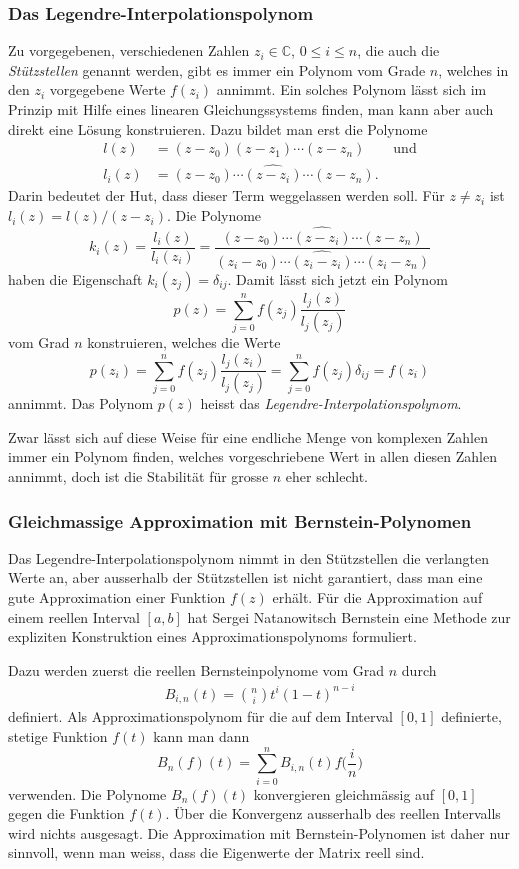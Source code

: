 \subsubsection{Das Legendre-Interpolationspolynom}
%
Zu vorgegebenen, verschiedenen Zahlen $z_i\in\mathbb{C}$, $0\le i\le n$,
die auch die {\em Stützstellen} genannt werden,
%
gibt es immer ein Polynom vom Grade $n$, welches in den $z_i$ vorgegebene
Werte $f(z_i)$ annimmt.
Ein solches Polynom lässt sich im Prinzip mit Hilfe eines linearen
Gleichungssystems finden, man kann aber auch direkt eine Lösung
konstruieren.
Dazu bildet man erst die Polynome
\begin{align*}
l(z) &= (z-z_0)(z-z_1)\cdots (z-z_n) \qquad\text{und}
\\
l_i(z) &= (z-z_0)\cdots \widehat{(z-z_i)}\cdots (z-z_n).
\end{align*}
Darin bedeutet der Hut, dass dieser Term weggelassen werden soll.
Für $z\ne z_i$ ist $l_i(z)=l(z)/(z-z_i)$.
Die Polynome
\[
k_i(z)
=
\frac{l_i(z)}{l_i(z_i)}
=
\frac{(z-z_0)\cdots \widehat{(z-z_i)}\cdots (z-z_n)}{(z_i-z_0)\cdots \widehat{(z_i-z_i)}\cdots (z_i-z_n)}
\]
haben die Eigenschaft
$k_i(z_j)=\delta_{i\!j}$.
Damit lässt sich jetzt ein Polynom
\[
p(z) = \sum_{j=0}^n f(z_j) \frac{l_j(z)}{l_j(z_j)}
\]
vom Grad $n$ konstruieren, welches die Werte
\[
p(z_i)
=
\sum_{j=0}^n f(z_j) \frac{l_j(z_i)}{l_j(z_j)}
=
\sum_{j=0}^n f(z_j) \delta_{i\!j}
=
f(z_i)
\]
annimmt.
Das Polynom $p(z)$ heisst das {\em Legendre-Interpolationspolynom}.

Zwar lässt sich auf diese Weise für eine endliche Menge von komplexen Zahlen
immer ein Polynom finden, welches vorgeschriebene Wert in allen diesen Zahlen
annimmt, doch ist die Stabilität für grosse $n$ eher schlecht.


\subsubsection{Gleichmassige Approximation mit Bernstein-Polynomen}
%
Das Legendre-Interpolationspolynom nimmt in den  Stützstellen die
verlangten Werte an, aber ausserhalb der Stützstellen ist nicht
garantiert, dass man eine gute Approximation einer Funktion $f(z)$
erhält.
Für die Approximation auf einem reellen Interval $[a,b]$ hat
Sergei Natanowitsch Bernstein eine Methode zur expliziten
Konstruktion eines Approximationspolynoms formuliert.

Dazu werden zuerst die reellen Bernsteinpolynome vom Grad $n$
durch
\begin{align*}
B_{i,n}(t) = \binom{n}{i} t^i(1-t)^{n-i}
\end{align*}
definiert.
Als Approximationspolynom für die auf dem Interval 
$[0,1]$ definierte, stetige Funktion $f(t)$ kann man dann
\[
B_n(f)(t)
=
\sum_{i=0}^n B_{i,n}(t) f\biggl(\frac{i}{n}\biggr)
\]
verwenden.
Die Polynome $B_n(f)(t)$ konvergieren gleichmässig auf $[0,1]$
gegen die Funktion $f(t)$.
Über die Konvergenz ausserhalb des reellen Intervalls wird nichts
ausgesagt.
Die Approximation mit Bernstein-Polynomen ist daher nur sinnvoll,
wenn man weiss, dass die Eigenwerte der Matrix reell sind.


